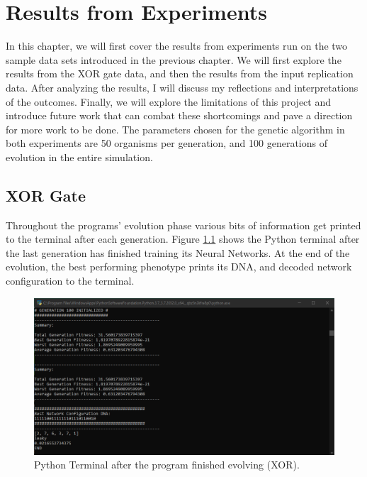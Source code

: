 \documentclass[12pt]{report}
\begin{document}
\chapter{Results from Experiments}
\label{results}
In this chapter, we will first cover the results from experiments run on the two sample data sets introduced in the previous chapter. We will first explore the results from the XOR gate data, and then  the results from the input replication data. After analyzing the results, I will discuss my reflections and interpretations of the outcomes. Finally, we will explore the limitations of this project and introduce future work that can combat these shortcomings and pave a direction for more work to be done. The parameters chosen for the genetic algorithm in both experiments are 50 organisms per generation, and 100 generations of evolution in the entire simulation.

\section{XOR Gate}
Throughout the programs' evolution phase various bits of information get printed to the terminal after each generation. Figure \ref{xorend} shows the Python terminal after the last generation has finished training its Neural  Networks. At the end of the evolution, the best performing phenotype prints its DNA, and decoded network configuration to the terminal.

\begin{figure}[hbt!]
    \centering
    \includegraphics[width=5in]{figures/xorend.png}
    \caption{Python Terminal after the program finished evolving (XOR).}
    \label{xorend}
\end{figure}
\end{document}
